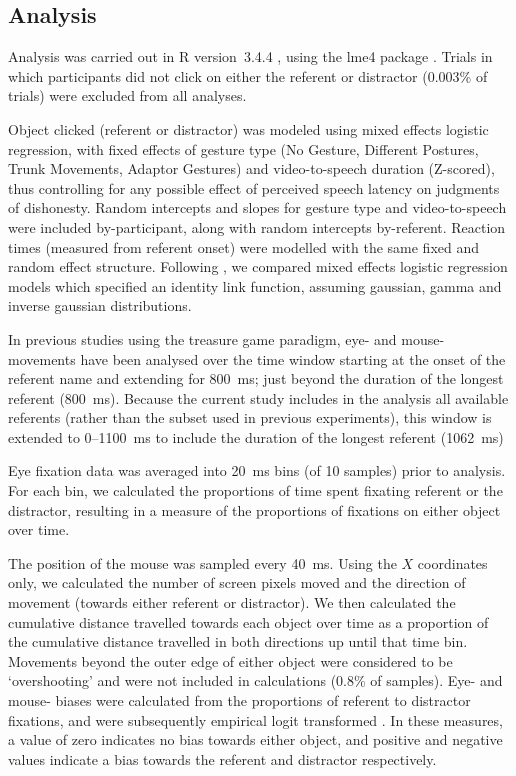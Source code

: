 \documentclass[a4paper,man,natbib]{apa6}
\begin{document}
\subsection{Analysis}
Analysis was carried out in R version~3.4.4 \citep{Rbase2017}, using the lme4 package \citep{Bates2015}. 
Trials in which participants did not click on either the referent or distractor (0.003\% of trials) were excluded from all analyses. 

Object clicked (referent or distractor) was modeled using mixed effects logistic regression, with fixed effects of gesture type (No Gesture, Different Postures, Trunk Movements, Adaptor Gestures) and video-to-speech duration (Z-scored), thus controlling for any possible effect of perceived speech latency on judgments of dishonesty.
Random intercepts and slopes for gesture type and video-to-speech were included by-participant, along with random intercepts by-referent.
Reaction times (measured from referent onset) were modelled with the same fixed and random effect structure.
Following \citet{Lo2015}, we compared mixed effects logistic regression models which specified an identity link function, assuming gaussian, gamma and inverse gaussian distributions.

In previous studies using the treasure game paradigm, eye- and mouse- movements have been analysed over the time window starting at the onset of the referent name and extending for 800~ms; just beyond the duration of the longest referent (800~ms). %
Because the current study includes in the analysis all available referents (rather than the subset used in previous experiments), this window is extended to 0--1100~ms to include the duration of the longest referent (1062~ms) %

Eye fixation data was averaged into 20~ms bins (of 10 samples) prior to analysis.
For each bin, we calculated the proportions of time spent fixating referent or the distractor, resulting in a measure of the proportions of fixations on either object over time.

The position of the mouse was sampled every 40~ms.
Using the $X$ coordinates only, we calculated the number of screen pixels moved and the direction of movement (towards either referent or distractor).
We then calculated the cumulative distance travelled towards each object over time as a proportion of the cumulative distance travelled in both directions up until that time bin.
Movements beyond the outer edge of either object were considered to be `overshooting' and were not included in calculations (0.8\% of samples).
Eye- and mouse- biases were calculated from the proportions of referent to distractor fixations, and were subsequently empirical logit transformed \citep{Barr2008}. 
In these measures, a value of zero indicates no bias towards either object, and positive and negative values indicate a bias towards the referent and distractor respectively.
\end{document}
